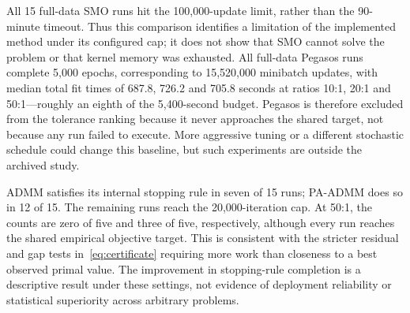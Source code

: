 \documentclass{article}
\begin{document}
All 15 full-data SMO runs hit the 100,000-update limit, rather than the 90-minute timeout. Thus this comparison identifies a limitation of the implemented method under its configured cap; it does not show that SMO cannot solve the problem or that kernel memory was exhausted. All full-data Pegasos runs complete 5,000 epochs, corresponding to 15,520,000 minibatch updates, with median total fit times of 687.8, 726.2 and 705.8 seconds at ratios 10:1, 20:1 and 50:1---roughly an eighth of the 5,400-second budget. Pegasos is therefore excluded from the tolerance ranking because it never approaches the shared target, not because any run failed to execute. More aggressive tuning or a different stochastic schedule could change this baseline, but such experiments are outside the archived study.

ADMM satisfies its internal stopping rule in seven of 15 runs; PA-ADMM does so in 12 of 15. The remaining runs reach the 20,000-iteration cap. At 50:1, the counts are zero of five and three of five, respectively, although every run reaches the shared empirical objective target. This is consistent with the stricter residual and gap tests in~\eqref{eq:certificate} requiring more work than closeness to a best observed primal value. The improvement in stopping-rule completion is a descriptive result under these settings, not evidence of deployment reliability or statistical superiority across arbitrary problems.
\end{document}
